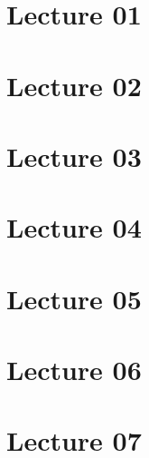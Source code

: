\documentclass[12pt, a4paper]{scrartcl}
\renewcommand{\thesection}{\arabic{section}}
\begin{document}




  

\renewcommand{\thesection}{\Roman{section}}

\clearpage
\section{Lecture 01}





\clearpage
\section{Lecture 02}



\clearpage
\section{Lecture 03}



\clearpage
\section{Lecture 04}




\clearpage
\section{Lecture 05}







\clearpage
\section{Lecture 06}




\clearpage
\section{Lecture 07}



\clearpage
\end{document}
